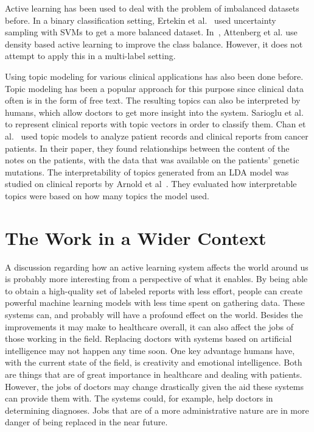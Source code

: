 Active learning has been used to deal with the problem of imbalanced datasets before.
In a binary classification setting, Ertekin et al\@.~\cite{ertekin2007learning} used uncertainty sampling with SVMs to get a more balanced dataset.
In~\cite{attenberg2013class}, Attenberg et al\@. use density based active learning to improve the class balance.
However, it does not attempt to apply this in a multi-label setting.

Using topic modeling for various clinical applications has also been done before.
Topic modeling has been a popular approach for this purpose since clinical data often is in the form of free text.
The resulting topics can also be interpreted by humans, which allow doctors to get more insight into the system.
Sarioglu et al\@.~\cite{sarioglu2013topic} to represent clinical reports with topic vectors in order to classify them.
Chan et al\@.~\cite{chan2013empirical} used topic models to analyze patient records and clinical reports from cancer patients.
In their paper, they found relationships between the content of the notes on the patients, with the data that was available on the patients' genetic mutations.
The interpretability of topics generated from an LDA model was studied on clinical reports by Arnold et al~\cite{arnold2016evaluating}.
They evaluated how interpretable topics were based on how many topics the model used.


\section{The Work in a Wider Context}

A discussion regarding how an active learning system affects the world around us is probably more interesting from a perspective of what it enables.
By being able to obtain a high-quality set of labeled reports with less effort, people can create powerful machine learning models with less time spent on gathering data.
These systems can, and probably will have a profound effect on the world.
Besides the improvements it may make to healthcare overall, it can also affect the jobs of those working in the field.
Replacing doctors with systems based on artificial intelligence may not happen any time soon.
One key advantage humans have, with the current state of the field, is creativity and emotional intelligence.
Both are things that are of great importance in healthcare and dealing with patients.
However, the jobs of doctors may change drastically given the aid these systems can provide them with.
The systems could, for example, help doctors in determining diagnoses.
Jobs that are of a more administrative nature are in more danger of being replaced in the near future.

